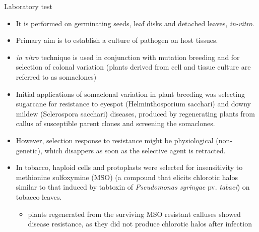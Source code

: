 \documentclass[11pt,dvipsnames,ignorenonframetext,aspectratio=169]{beamer}
\providecommand{\tightlist}{%
  \setlength{\itemsep}{0pt}\setlength{\parskip}{0pt}}
\begin{document}
\begin{frame}{Laboratory test}
\protect\hypertarget{laboratory-test}{}
\footnotesize

\begin{itemize}
\tightlist
\item
  It is performed on germinating seeds, leaf disks and detached leaves,
  \emph{in-vitro}.
\item
  Primary aim is to establish a culture of pathogen on host tissues.
\item
  \emph{in vitro} technique is used in conjunction with mutation
  breeding and for selection of colonal variation (plants derived from
  cell and tissue culture are referred to as somaclones)
\item
  Initial applications of somaclonal variation in plant breeding was
  selecting sugarcane for resistance to eyespot (Helminthosporium
  sacchari) and downy mildew (Sclerospora sacchari) diseases, produced
  by regenerating plants from callus of susceptible parent clones and
  screening the somaclones.
\item
  However, selection response to resistance might be physiological
  (non-genetic), which disappers as soon as the selective agent is
  retracted.
\item
  In tobacco, haploid cells and protoplasts were selected for
  insensitivity to methionine sulfoxymine (MSO) (a compound that elicits
  chlorotic halos similar to that induced by tabtoxin of
  \emph{Pseudomonas syringae} pv. \emph{tabaci}) on tobacco leaves.

  \begin{itemize}
  \item plants regenerated from the surviving MSO resistant calluses showed disease resistance, as they did not produce chlorotic halos after infection
  \end{itemize}
\end{itemize}
\end{frame}
\end{document}
